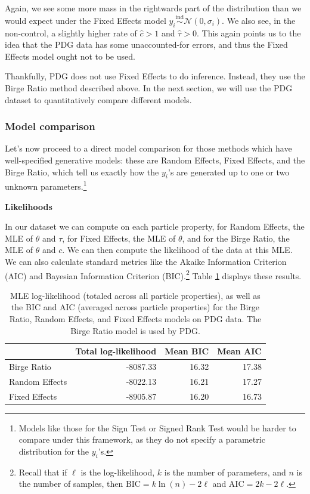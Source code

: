 \documentclass[12pt]{article}
\begin{document}
Again, we see some more mass in the rightwards part of the distribution than we would expect under the Fixed Effects model $y_i\overset{\mathrm{ind}}{\sim}\mathcal{N}(0, \sigma_i)$. We also see, in the non-control, a slightly higher rate of $\hat c >1$ and $\hat \tau > 0$. This again points us to the idea that the PDG data has some unaccounted-for errors, and thus the Fixed Effects model ought not to be used.

Thankfully, PDG does not use Fixed Effects to do inference. Instead, they use the Birge Ratio method described above. In the next section, we will use the PDG dataset to quantitatively compare different models.

\subsubsection{Model comparison}\label{model-comparison}

Let's now proceed to a direct model comparison for those methods which have well-specified generative models: these are Random Effects, Fixed Effects, and the Birge Ratio, which tell us exactly how the $y_i$'s are generated up to one or two unknown parameters.\footnote{Models like those for the Sign Test or Signed Rank Test would be harder to compare under this framework, as they do not specify a parametric distribution for the $y_i$'s.}

\textbf{Likelihoods}

In our dataset we can compute on each particle property, for Random Effects, the MLE of $\theta$ and $\tau$, for Fixed Effects, the MLE of $\theta$, and for the Birge Ratio, the MLE of $\theta$ and $c$. We can then compute the likelihood of the data at this MLE. We can also calculate standard metrics like the Akaike Information Criterion (AIC) and Bayesian Information Criterion (BIC).\footnote{Recall that if $\ell$ is the log-likelihood, $k$ is the number of parameters, and $n$ is the number of samples, then $\mathrm{BIC}=k\ln(n)-2\ell$ and $\mathrm{AIC}=2k-2\ell$.}  Table \ref{tab:pdg-loglike} displays these results.

\begin{table}
  \centering
  \caption{MLE log-likelihood (totaled across all particle properties), as well as the BIC and AIC (averaged across particle properties) for the Birge Ratio, Random Effects, and Fixed Effects models on PDG data. The Birge Ratio model is used by PDG.}
  \label{tab:pdg-loglike}
  \begin{tabular}{lrrr}
    \hline
     & Total log-likelihood & Mean BIC & Mean AIC \\
    \hline
    Birge Ratio & -8087.33 & 16.32 & 17.38 \\
    Random Effects & -8022.13 & 16.21 & 17.27 \\
    Fixed Effects & -8905.87 & 16.20 & 16.73 \\
    \hline
    \end{tabular}
\end{table}
\end{document}
